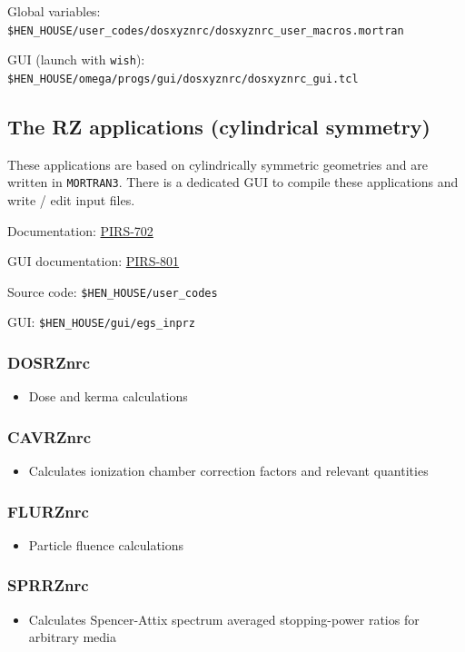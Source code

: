 \documentclass[12pt,twoside]{article}
\begin{document}
Global variables: \Verb+$HEN_HOUSE/user_codes/dosxyznrc/dosxyznrc_user_macros.mortran+

GUI (launch with \Verb+wish+): \Verb+$HEN_HOUSE/omega/progs/gui/dosxyznrc/dosxyznrc_gui.tcl+

\clearpage
\subsection{The RZ applications (cylindrical symmetry)}
These applications are based on cylindrically symmetric geometries and are
written in \Verb+MORTRAN3+. There is a dedicated GUI to compile these
applications and write / edit input files.

Documentation: \href{http://nrc-cnrc.github.io/EGSnrc/doc/pirs702-egsnrc-codes.pdf}{PIRS-702}

GUI documentation: \href{http://nrc-cnrc.github.io/EGSnrc/doc/pirs801-egsinprz.pdf}{PIRS-801}

Source code: \Verb+$HEN_HOUSE/user_codes+

GUI: \Verb+$HEN_HOUSE/gui/egs_inprz+

\subsubsection{DOSRZnrc}
\begin{itemize}
\item Dose and kerma calculations
\end{itemize}
\subsubsection{CAVRZnrc}
\begin{itemize}
\item Calculates ionization chamber correction factors and relevant quantities
\end{itemize}
\subsubsection{FLURZnrc}
\begin{itemize}
\item Particle fluence calculations
\end{itemize}
\subsubsection{SPRRZnrc}
\begin{itemize}
\item Calculates Spencer-Attix spectrum averaged stopping-power ratios for arbitrary media
\end{itemize}
\end{document}
